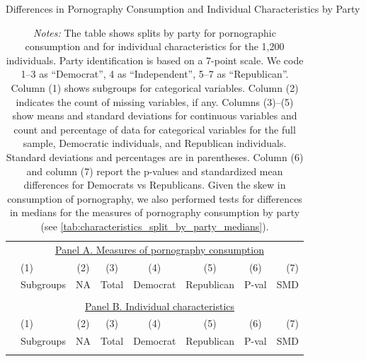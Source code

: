 \documentclass[12pt, letterpaper]{article}
\begin{document}
\begin{table}[ht] \centering \small \setlength\tabcolsep{5 pt}
	\caption{Differences in Pornography Consumption and Individual Characteristics by Party}
	\label{tab:characteristics_split_by_party}
	\begin{adjustbox}{max width=\textwidth}
		\begin{tabular}{@{\hspace{0\tabcolsep}}llrcccrr@{\hspace{0\tabcolsep}}}
			\toprule
			&\multicolumn{7}{c}{\underline{Panel A. Measures of pornography consumption}}\\
			&\multicolumn{1}{l}{(1)}&\multicolumn{1}{c}{(2)}&\multicolumn{1}{c}{(3)}&\multicolumn{1}{c}{(4)}&\multicolumn{1}{c}{(5)}&\multicolumn{1}{c}{(6)}&\multicolumn{1}{r}{(7)}\\			
			&\multicolumn{1}{l}{Subgroups}&\multicolumn{1}{c}{NA}&\multicolumn{1}{c}{Total}&\multicolumn{1}{c}{Democrat}&\multicolumn{1}{c}{Republican}&\multicolumn{1}{c}{P-val}&\multicolumn{1}{r}{SMD}\\
			\cmidrule{2-8}
			\\
			\cmidrule{2-8}
			&\multicolumn{7}{c}{\underline{Panel B. Individual characteristics}}\\
			&\multicolumn{1}{l}{(1)}&\multicolumn{1}{c}{(2)}&\multicolumn{1}{c}{(3)}&\multicolumn{1}{c}{(4)}&\multicolumn{1}{c}{(5)}&\multicolumn{1}{c}{(6)}&\multicolumn{1}{r}{(7)}\\			
			&\multicolumn{1}{l}{Subgroups}&\multicolumn{1}{c}{NA}&\multicolumn{1}{c}{Total}&\multicolumn{1}{c}{Democrat}&\multicolumn{1}{c}{Republican}&\multicolumn{1}{c}{P-val}&\multicolumn{1}{r}{SMD}\\
			\cmidrule{2-8}
			\\
			\bottomrule
		\end{tabular}
	\end{adjustbox}
	\caption*{\scriptsize \emph{Notes:}
		The table shows splits by party for pornographic consumption and for individual characteristics for the 1,200 individuals.
		Party identification is based on a 7-point scale. We code 1--3 as ``Democrat'', 4 as ``Independent'', 5--7 as ``Republican''.
		Column (1) shows subgroups for categorical variables.
		Column (2) indicates the count of missing variables, if any.
		Columns (3)--(5) show means and standard deviations for continuous variables and count and percentage of data for categorical variables for the full sample, Democratic individuals, and Republican individuals.
		Standard deviations and percentages are in parentheses.
		Column (6) and column (7) report the p-values and standardized mean differences for Democrats vs Republicans.
		Given the skew in consumption of pornography, we also performed tests for differences in medians for the measures of pornography consumption by party (see \cref{tab:characteristics_split_by_party_medians}).
	}
\end{table}
\end{document}
